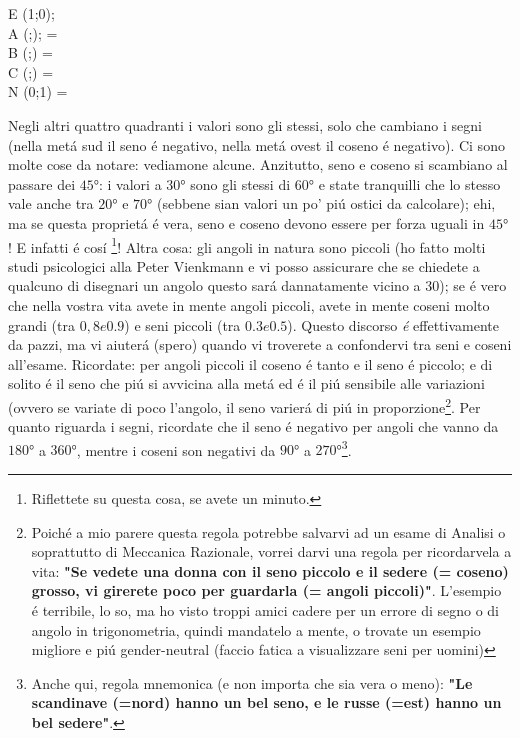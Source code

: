 \begin{equazione}
	E \equiv (1;0);  \\
	A \equiv (;); \theta= \\
	B \equiv (;) 			\theta= \\
	C \equiv (;) \theta= \\
	N \equiv (0;1) \theta= \\
\end{equazione}

Negli altri quattro quadranti i valori sono gli stessi, solo che cambiano i segni (nella met\'a sud il seno \'e negativo, nella met\'a ovest il coseno \'e negativo).
Ci sono molte cose da notare: vediamone alcune. Anzitutto, seno e coseno si scambiano al passare dei $\ang{45}$: i valori a $\ang{30}$ sono gli stessi di $\ang{60}$ e state tranquilli
che lo stesso vale anche tra $\ang{20}$ e $\ang{70}$ (sebbene sian valori un po' pi\'u ostici da calcolare); ehi, ma se questa propriet\'a \'e vera, seno e coseno devono
essere per forza uguali in $\ang{45}$! E infatti \'e cos\'i \footnote{Riflettete su questa cosa, se avete un minuto.}! Altra cosa: gli angoli in natura sono piccoli
(ho fatto molti studi psicologici alla Peter Vienkmann e vi posso assicurare che se chiedete a qualcuno di disegnari un angolo questo sar\'a dannatamente vicino a $30$);
se \'e vero che nella vostra vita avete in mente angoli piccoli, avete in mente coseni molto grandi (tra $0,8 e 0.9$) e seni piccoli (tra $0.3 e 0.5$). Questo discorso {\em \'e}
effettivamente da pazzi, ma vi aiuter\'a (spero) quando vi troverete a confondervi tra seni e coseni all'esame. Ricordate: per angoli piccoli il coseno \'e tanto e il seno \'e
piccolo; e di solito \'e il seno che pi\'u si avvicina alla met\'a ed \'e il pi\'u sensibile alle variazioni (ovvero se variate di poco l'angolo, il seno varier\'a di pi\'u
in proporzione\footnote{Poich\'e a mio parere questa regola potrebbe salvarvi ad un esame di Analisi o soprattutto di Meccanica Razionale, vorrei darvi una regola per ricordarvela
a vita: {\bf "Se vedete una donna con il seno piccolo e il sedere (= coseno) grosso, vi girerete poco per guardarla (= angoli piccoli)"}. L'esempio \'e terribile, lo so,
ma ho visto troppi amici cadere per un errore di segno o di angolo in trigonometria, quindi mandatelo a mente, o trovate un esempio migliore e pi\'u gender-neutral (faccio
fatica a visualizzare seni per uomini)}. 	
Per quanto riguarda i segni, ricordate che il seno \'e negativo per angoli che vanno da $\ang{180}$ a $\ang{360}$, mentre i coseni son negativi da $\ang{90}$ a $\ang{270}$\footnote{Anche qui,
	regola mnemonica (e non importa che sia vera o meno): {\bf "Le scandinave (=nord) hanno un bel seno, e le russe (=est) hanno un bel sedere"}.}.

